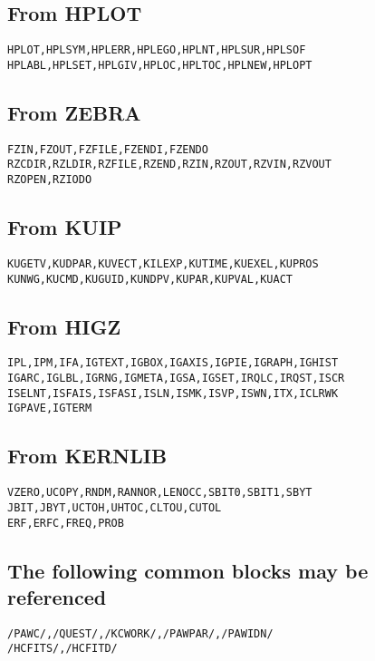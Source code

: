 \subsection*{From HPLOT}
\begin{alltt}
      HPLOT,HPLSYM,HPLERR,HPLEGO,HPLNT,HPLSUR,HPLSOF
      HPLABL,HPLSET,HPLGIV,HPLOC,HPLTOC,HPLNEW,HPLOPT
\end{alltt}
\subsection*{From ZEBRA}
\begin{alltt}
      FZIN,FZOUT,FZFILE,FZENDI,FZENDO
      RZCDIR,RZLDIR,RZFILE,RZEND,RZIN,RZOUT,RZVIN,RZVOUT
      RZOPEN,RZIODO
\end{alltt}
\subsection*{From KUIP}
\begin{alltt}
      KUGETV,KUDPAR,KUVECT,KILEXP,KUTIME,KUEXEL,KUPROS
      KUNWG,KUCMD,KUGUID,KUNDPV,KUPAR,KUPVAL,KUACT
\end{alltt}
\clearpage
\subsection*{From HIGZ}
\begin{alltt}
      IPL,IPM,IFA,IGTEXT,IGBOX,IGAXIS,IGPIE,IGRAPH,IGHIST
      IGARC,IGLBL,IGRNG,IGMETA,IGSA,IGSET,IRQLC,IRQST,ISCR
      ISELNT,ISFAIS,ISFASI,ISLN,ISMK,ISVP,ISWN,ITX,ICLRWK
      IGPAVE,IGTERM
\end{alltt}
\subsection*{From KERNLIB}
\begin{alltt}
      VZERO,UCOPY,RNDM,RANNOR,LENOCC,SBIT0,SBIT1,SBYT
      JBIT,JBYT,UCTOH,UHTOC,CLTOU,CUTOL
      ERF,ERFC,FREQ,PROB
\end{alltt}
\subsection*{The following common blocks may be referenced}
\begin{alltt}
     /PAWC/, /QUEST/, /KCWORK/, /PAWPAR/, /PAWIDN/
     /HCFITS/, /HCFITD/
\end{alltt}

\clearpage

